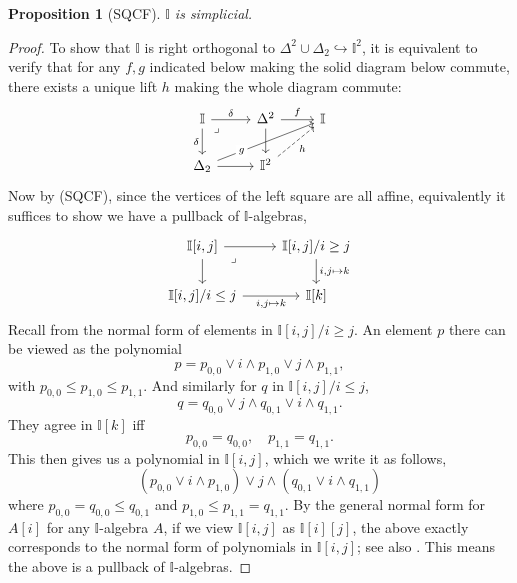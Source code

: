 \documentclass[a4paper,12pt]{amsart}
\newtheorem{proposition}[theorem]{Proposition}
\theoremstyle{definition}
\newcommand{\mbb}[1]{\mathbb{#1}}
\newcommand{\I}{\mbb I}
\newcommand{\hook}{\hookrightarrow}
\begin{document}
\begin{proposition}[SQCF]\label{specissimplicial}
  $\I$ is simplicial.
\end{proposition}
\begin{proof}
  To show that $\I$ is right orthogonal to $\Delta^2 \cup \Delta_2 \hook \I^2$, it is equivalent to verify that for any $f,g$ indicated below making the solid diagram below commute, there exists a unique lift $h$ making the whole diagram commute:
  \[\begin{tikzcd}
    \I \ar[r, "\delta"] \ar[d, "\delta"'] & \Delta^2 \ar[r, "f"] \ar[d] & \I \\
    \Delta_2 \ar[urr, "g"{description, near start}] \ar[r] & \I^2 \ar[ur, dashed, "h"']
    \arrow["\lrcorner"{anchor=center, pos=0.125}, draw=none, from=1-1, to=2-2]
  \end{tikzcd}\]
  Now by (SQCF), since the vertices of the left square are all affine, equivalently it suffices to show we have a pullback of $\I$-algebras,
  \[\begin{tikzcd}
    {\I[i,j]} \ar[r] \ar[d] & {\I[i,j]/i \ge j} \ar[d, "{i,j \mapsto k}"] \\
    {\I[i,j]/i \le j} \ar[r, "{i,j\mapsto k}"'] & {\I[k]}
    \arrow["\lrcorner"{anchor=center, pos=0.125}, draw=none, from=1-1, to=2-2]
  \end{tikzcd}\]
  Recall from  the normal form of elements in $\I[i,j]/i\ge j$. An element $p$ there can be viewed as the polynomial 
  \[ p = p_{0,0} \vee i \wedge p_{1,0} \vee j \wedge p_{1,1}, \]
  with $p_{0,0} \le p_{1,0} \le p_{1,1}$. And similarly for $q$ in $\I[i,j]/i \le j$, 
  \[ q = q_{0,0} \vee j \wedge q_{0,1} \vee i \wedge q_{1,1}. \]
  They agree in $\I[k]$ iff 
  \[ p_{0,0} = q_{0,0}, \quad p_{1,1} = q_{1,1}. \]
  This then gives us a polynomial in $\I[i,j]$, which we write it as follows,
  \[ (p_{0,0} \vee i \wedge p_{1,0}) \vee j \wedge (q_{0,1} \vee i \wedge q_{1,1}) \]
  where $p_{0,0} = q_{0,0} \le q_{0,1}$ and $p_{1,0} \le p_{1,1} = q_{1,1}$. 
  By the general normal form for $A[i]$ for any $\I$-algebra $A$, if we view $\I[i,j]$ as $\I[i][j]$, the above exactly corresponds to the normal form of polynomials in $\I[i,j]$; see also \citet[Thm. 10.21]{lausch2000algebra}. This means the above is a pullback of $\I$-algebras.
\end{proof}
\end{document}
